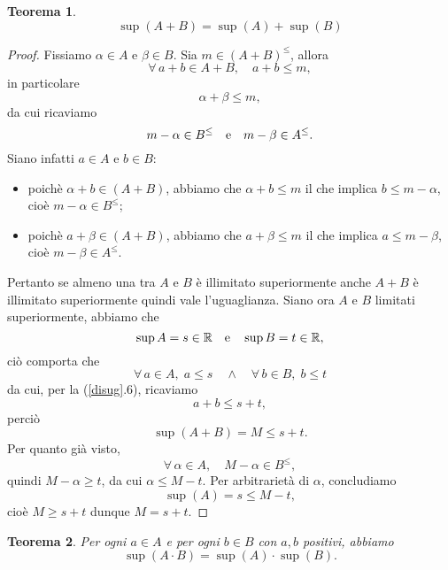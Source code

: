 \documentclass{article}
\theoremstyle{plain}
\newtheorem{thm}{Teorema}[section]
\theoremstyle{definition}
\theoremstyle{remark}
\begin{document}
\begin{bxthm}
\begin{thm}
    \[\sup(A+B)=\sup(A)+\sup(B)\]
\end{thm}
\end{bxthm}
\begin{proof}
    Fissiamo $\alpha\in A$ e $\beta\in B$.
    Sia $m\in(A+B)^\leq$, allora 
    \[\forall\,a+b\in A+B,\quad a+b\leq m,\]
    in particolare 
    \[\alpha+\beta\leq m, \]
    da cui ricaviamo 
    \[m-\alpha\in B^\leq\quad\textup{e}\quad m-\beta\in A^\leq.\]
    Siano infatti $a\in A$ e $b\in B$:
    \begin{itemize}
        \item poichè $\alpha+b\in(A+B)$, abbiamo che $\alpha+b\leq m$ il che implica $b\leq m-\alpha$, cioè $m-\alpha\in B^\leq$;
        \item poichè $a+\beta\in(A+B)$, abbiamo che $a+\beta\leq m$ il che implica  $a\leq m-\beta$, cioè $m-\beta\in A^\leq$.
    \end{itemize}
    Pertanto se almeno una tra $A$ e $B$ è illimitato superiormente anche $A+B$ è illimitato superiormente quindi vale l'uguaglianza.
    Siano ora $A$ e $B$ limitati superiormente, abbiamo che 
    \[\sup A=s\in\mathbb{R}\quad\textup{e}\quad\sup B=t\in\mathbb{R},\]
    ciò comporta che 
    \[ \forall\,a\in A,\; a\leq s\quad\land\quad \forall\,b\in B,\; b\leq t \]
    da cui, per la (\ref{disug}.6), ricaviamo 
    \[a+b\leq s+t,\]
    perciò \[\sup(A+B)=M\leq s+t.\]
    Per quanto già visto, 
    \[\forall\, \alpha \in A,\quad M-\alpha\in B^\leq,\]
    quindi $M-\alpha\geq t$, da cui $\alpha\leq M-t$.
    Per arbitrarietà di $\alpha$, concludiamo 
    \[\sup(A)=s\leq M-t,\]
    cioè $M\geq s+t$ dunque $M=s+t$.
\end{proof}

\vspace{10pt}

\begin{bxthm}
\begin{thm}
    Per ogni $a\in A$ e per ogni $b\in B$ con $a,b$ positivi, abbiamo
    \[\sup(A\cdot B) = \sup(A)\cdot\sup(B).\]
\end{thm}
\end{bxthm}

\vspace{10pt}
\end{document}
